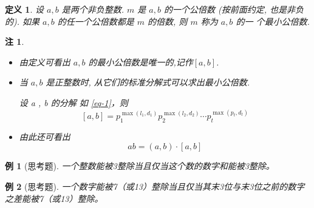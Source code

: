\documentclass[13pt,punct]{ctexbeamer}
\newtheorem{exa}{例}
\newtheorem*{defi}{定义}
\newtheorem*{rem}{注}
\begin{document}
\begin{frame}

\begin{defi}
设 $a ,b$ 是两个非负整数. $m$ 是 $a, b$ 的一个公倍数  (按前面约定, 也是非负的).
如果 $a , b$ 的任一个公倍数都是 $m$ 的倍数, 则 $m$ 称为 $a, b$ 的一 个\alert{最小公倍数}.
\end{defi}
\begin{rem}
\begin{itemize}
\item 由定义可看出 $a ,b$ 的最小公倍数是唯一的,记作$[a, b]$.
\item 当 $a, b$ 是正整数时, 从它们的标准分解式可以求出最小公倍数.

设 a , b 的分解 如 \eqref{eq-1}，则
\[
[a, b]=p_{1}^{\max \left(l_{1}, d_{1}\right)} p_{2}^{\max \left(l_{2}, d_{2}\right)} \cdots p_{t}^{\max \left(p_{t}, d_{t}\right)}
\]
\item 由此还可看出
\[
a  b=(a, b) \cdot[a, b]
\]
\end{itemize}
\end{rem}

\end{frame}


\begin{frame}
	\begin{exa}[思考题]
一个整数能被3整除当且仅当这个数的数字和能被3整除。
	\end{exa}

\begin{exa}[思考题]
一个数字能被7（或13）整除当且仅当其末3位与末3位之前的数字之差能被7（或13）整除。
\end{exa}


\end{frame}


%
\end{document}

